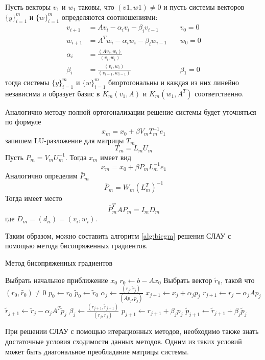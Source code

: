 \documentclass[a4paper, fontsize=14pt]{article}
\begin{document}
    Пусть векторы $v_1$ и $w_1$ таковы, что $(v1 , w1) \neq 0$ и пусть системы векторов $\{y\}^m_{i=1}$
и $\{w\}^m_{i=1}$ определяются соотношениями:
\begin{align*}
    v_{i+1} &= A v_i - \alpha_i v_i - \beta_i v_{i-1} \quad &v_0 = 0\\
    w_{i+1} &= A^T w_i - \alpha_i w_i - \beta_i w_{i-1} \quad &w_0 = 0\\
    \alpha_i &= \frac{(Av_i,w_i)}{(v_i,w_i)} \\ 
    \beta_i &= \frac{(v_i,w_i)}{(v_{i-1},w_{i-1})} \quad &\beta_1 = 0
\end{align*}
тогда системы $\{y\}^m_{i=1}$ и $\{w\}^m_{i=1}$ биортогональны и каждая из них линейно независима и
образует базис в $K_m(v_1,A)$ и $K_m(w_1,A^T)$ соответственно.

Аналогично методу полной ортогонализации решение системы будет уточняться по формуле
$$ x_m = x_0 +\beta V_m T_m^{-1} e_1 $$
запишем LU-разложение для матрицы $T_m$
$$ T_m =  L_m U_m $$
Пусть $P_m = V_m U_m^{-1}$. Тогда $x_m$ имеет вид
$$ x_m = x_0 + \beta P_m L_m^{-1} e_1 $$
Аналогично определим $\bar{P}_m$
$$ \bar{P}_m = W_m (L_m^T)^{-1} $$
Тогда имеет место
$$ \bar{P}_m^T A P_m = I_m  D_m $$ 
где $D_m = (d_{ii}) = (v_i,w_i)$.

Таким образом, можно составить алгоритм \ref{alg:bicgm} решения СЛАУ с помощью метода бисопряженных градиентов.
\begin{algorithm}
    \caption{Метод бисопряженных градиентов}\label{alg:bicgm}
\begin{algorithmic}
    \State Выбрать начальное приближение $x_0$
    \State $r_0 \gets b - Ax_0$
    \State Выбрать вектор $\tilde{r}_0$, такой что $(r_0,\tilde{r_0}) \neq 0$
    \State $p_0 \gets r_0$
    \State $\tilde{p}_0 \gets \tilde{r}_0$
        \State $\alpha_j \gets \frac{(r_j,\tilde{r}_j)}{(Ap_j,\tilde{p}_j)}$
        \State $x_{j+1} \gets x_{j} + \alpha_j p_j$
        \State $r_{j+1} \gets r_j - \alpha_j A p_j$
        \State $\tilde{r}_{j+1} \gets \tilde{r}_j - \alpha_j A^T \tilde{p}_j$
        \State $\beta_j \gets \frac{(r_{j+1},\tilde{r}_{j+1})}{(r_j,\tilde{r}_j)}$
        \State $ p_{j+1} \gets r_{j+1}+\beta_j p_j$
        \State $ \tilde{p}_{j+1} \gets \tilde{r}_{j+1}+\beta_j \tilde{p}_j$
    \EndFor

\end{algorithmic}
\end{algorithm}
    
    При решении СЛАУ с помощью итерационных методов, необходимо также знать достаточные условия
сходимости данных методов. Одним из таких условий может быть диагональное преобладание матрицы
системы.  
\end{document}
